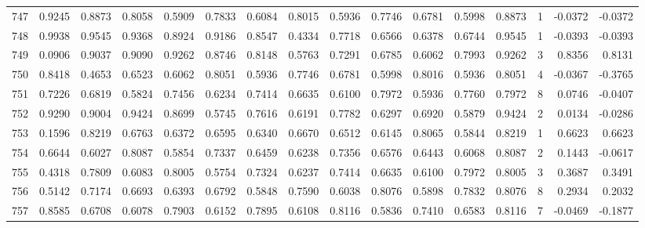\begin{tabular}{lrrrrrrrrrrrrrrr}
747 &      0.9245 &  0.8873 &  0.8058 &  0.5909 &  0.7833 &  0.6084 &  0.8015 &  0.5936 &  0.7746 &  0.6781 &   0.5998 &     0.8873 &      1 &                   -0.0372 &                    -0.0372 \\
748 &      0.9938 &  0.9545 &  0.9368 &  0.8924 &  0.9186 &  0.8547 &  0.4334 &  0.7718 &  0.6566 &  0.6378 &   0.6744 &     0.9545 &      1 &                   -0.0393 &                    -0.0393 \\
749 &      0.0906 &  0.9037 &  0.9090 &  0.9262 &  0.8746 &  0.8148 &  0.5763 &  0.7291 &  0.6785 &  0.6062 &   0.7993 &     0.9262 &      3 &                    0.8356 &                     0.8131 \\
750 &      0.8418 &  0.4653 &  0.6523 &  0.6062 &  0.8051 &  0.5936 &  0.7746 &  0.6781 &  0.5998 &  0.8016 &   0.5936 &     0.8051 &      4 &                   -0.0367 &                    -0.3765 \\
751 &      0.7226 &  0.6819 &  0.5824 &  0.7456 &  0.6234 &  0.7414 &  0.6635 &  0.6100 &  0.7972 &  0.5936 &   0.7760 &     0.7972 &      8 &                    0.0746 &                    -0.0407 \\
752 &      0.9290 &  0.9004 &  0.9424 &  0.8699 &  0.5745 &  0.7616 &  0.6191 &  0.7782 &  0.6297 &  0.6920 &   0.5879 &     0.9424 &      2 &                    0.0134 &                    -0.0286 \\
753 &      0.1596 &  0.8219 &  0.6763 &  0.6372 &  0.6595 &  0.6340 &  0.6670 &  0.6512 &  0.6145 &  0.8065 &   0.5844 &     0.8219 &      1 &                    0.6623 &                     0.6623 \\
754 &      0.6644 &  0.6027 &  0.8087 &  0.5854 &  0.7337 &  0.6459 &  0.6238 &  0.7356 &  0.6576 &  0.6443 &   0.6068 &     0.8087 &      2 &                    0.1443 &                    -0.0617 \\
755 &      0.4318 &  0.7809 &  0.6083 &  0.8005 &  0.5754 &  0.7324 &  0.6237 &  0.7414 &  0.6635 &  0.6100 &   0.7972 &     0.8005 &      3 &                    0.3687 &                     0.3491 \\
756 &      0.5142 &  0.7174 &  0.6693 &  0.6393 &  0.6792 &  0.5848 &  0.7590 &  0.6038 &  0.8076 &  0.5898 &   0.7832 &     0.8076 &      8 &                    0.2934 &                     0.2032 \\
757 &      0.8585 &  0.6708 &  0.6078 &  0.7903 &  0.6152 &  0.7895 &  0.6108 &  0.8116 &  0.5836 &  0.7410 &   0.6583 &     0.8116 &      7 &                   -0.0469 &                    -0.1877 \\

\end{tabular}
